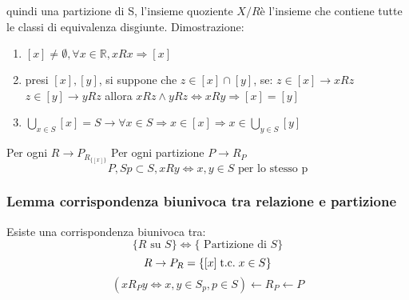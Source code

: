\documentclass[a4paper,12pt]{article}
\newcommand{\rel}[1][R]{R}
\begin{document}
	quindi una partizione di S, l'insieme quoziente $X/\rel$è l'insieme che contiene tutte le classi di equivalenza disgiunte. \newline
	Dimostrazione:
	\begin{enumerate}
		\item $[x] \not = \emptyset, \forall x \in \mathbb{R}, x \rel x \Rightarrow [x]$
		\item presi $[x], [y]$, si suppone che $z \in [x] \cap [y]$, se:
		\subitem $z \in [x] \rightarrow x \rel z$
		\subitem $z \in [y] \rightarrow y \rel z$ \newline
		allora $x \rel z \wedge y \rel z \iff x \rel y \Rightarrow [x] = [y]$
		\item $\displaystyle \bigcup_{x \in S} [x] = S \rightarrow \forall x \in S \Rightarrow x \in [x] \Rightarrow x \in \bigcup_{y \in S} [y]$
	\end{enumerate}
	Per ogni $\rel \longrightarrow P_{\rel_{\{[x]\}}}$ \newline %
	Per ogni partizione $P \longrightarrow \rel_P$
	\[P, Sp \subset S, x \rel y \iff x,y \in S \text{ per lo stesso p}\]
	
	\subsubsection{Lemma corrispondenza biunivoca tra relazione e partizione}
	Esiste una corrispondenza biunivoca tra:
	\[\{\rel \text{ su } S\} \iff \{\text{ Partizione di } S\}\]
	\[\rel \rightarrow P_{\rel} = \{[x] \tc x \in S\}\]
	\[(x \rel_P y \iff x,y \in S_p, p \in S )\leftarrow \rel_P \leftarrow P\]
	
\end{document}
